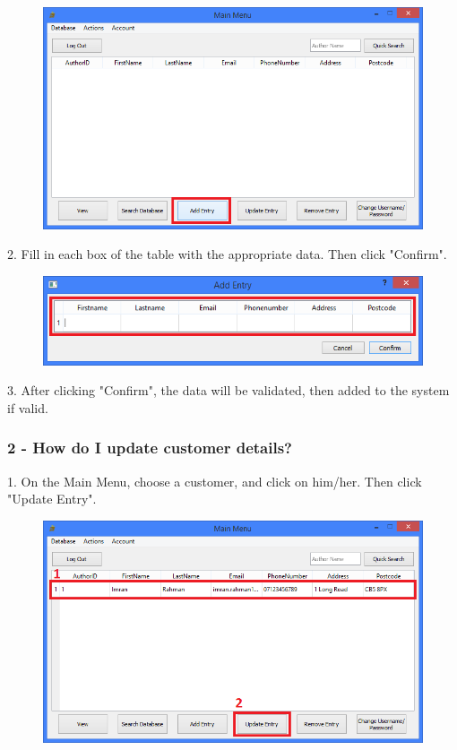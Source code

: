 \begin{figure}[H]
    \includegraphics[width=\textwidth]{./Manual/Tutorial/Q1/AddEntryHighlighted.png}
\end{figure}


2. Fill in each box of the table with the appropriate data. Then click "Confirm".

\begin{figure}[H]
    \includegraphics[width=\textwidth]{./Manual/Tutorial/Q1/AddingEntry.png}
\end{figure}

3. After clicking "Confirm", the data will be validated, then added to the system if valid.

\subsubsection{2 -  How do I update customer details?}

1. On the Main Menu, choose a customer, and click on him/her. Then click "Update Entry".

\begin{figure}[H]
    \includegraphics[width=\textwidth]{./Manual/Tutorial/Q2/SelectingEntry.png}
\end{figure}

